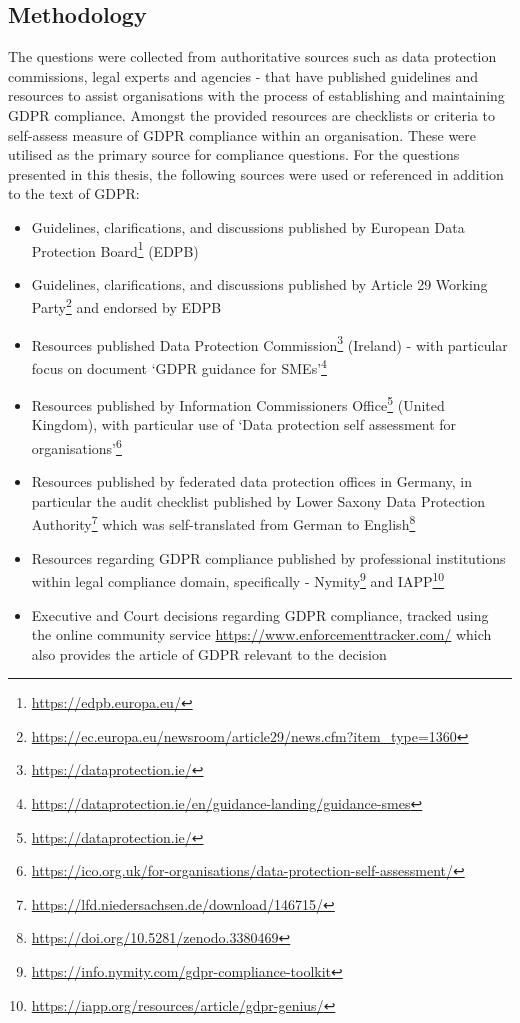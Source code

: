 \subsection{Methodology}
The questions were collected from authoritative sources such as data protection commissions, legal experts and agencies - that have published guidelines and resources to assist organisations with the process of establishing and maintaining GDPR compliance.
Amongst the provided resources are checklists or criteria to self-assess measure of GDPR compliance within an organisation. These were utilised as the primary source for compliance questions.
For the questions presented in this thesis, the following sources were used or referenced in addition to the text of GDPR:
\begin{itemize}
    \item Guidelines, clarifications, and discussions published by European Data Protection Board\footnote{\url{https://edpb.europa.eu/}} (EDPB)
    \item Guidelines, clarifications, and discussions published by Article 29 Working Party\footnote{\url{https://ec.europa.eu/newsroom/article29/news.cfm?item_type=1360}} and endorsed by EDPB
    \item Resources published Data Protection Commission\footnote{\url{https://dataprotection.ie/}} (Ireland) - with particular focus on document `GDPR guidance for SMEs'\footnote{\url{https://dataprotection.ie/en/guidance-landing/guidance-smes}}
    \item Resources published by Information Commissioners Office\footnote{\url{https://dataprotection.ie/}} (United Kingdom), with particular use of `Data protection self assessment for organisations'\footnote{\url{https://ico.org.uk/for-organisations/data-protection-self-assessment/}}
    \item Resources published by federated data protection offices in Germany, in particular the audit checklist published by Lower Saxony Data Protection Authority\footnote{\url{https://lfd.niedersachsen.de/download/146715/}} which was self-translated from German to English\footnote{\url{https://doi.org/10.5281/zenodo.3380469}}
    \item Resources regarding GDPR compliance published by professional institutions within legal compliance domain, specifically - Nymity\footnote{\url{https://info.nymity.com/gdpr-compliance-toolkit}} and IAPP\footnote{\url{https://iapp.org/resources/article/gdpr-genius/}}
    \item Executive and Court decisions regarding GDPR compliance, tracked using the online community service \url{https://www.enforcementtracker.com/} which also provides the article of GDPR relevant to the decision
\end{itemize}

